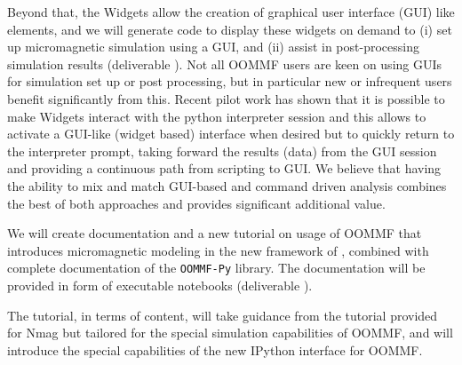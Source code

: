 \begin{workpackage}
\begin{tasklist}
\begin{task}[lead=USO,title=OOMMF case study: Extend \texttt{OOMMF-py} with \Jupyter
    notebook attributes and GUI templates,id=oommf-py-ipython-attributes,PM=6]
  Beyond that, the \Jupyter Widgets allow the creation of graphical
  user interface (GUI) like elements, and we will generate code to
  display these widgets on demand to (i) set up micromagnetic
  simulation using a GUI, and (ii) assist in post-processing
  simulation results (deliverable ).
  Not all OOMMF users are keen on using GUIs for
  simulation set up or post processing, but in particular new or
  infrequent users benefit significantly from this. Recent pilot work
  has shown that it is possible to make \Jupyter Widgets interact with
  the python interpreter session and this allows to activate a
  GUI-like (widget based) interface when desired but to quickly return
  to the interpreter prompt, taking forward the results (data) from
  the GUI session \cite{IPython-widget-GUI-demo-youtube-2014} and
  providing a continuous path from scripting to GUI. We
  believe that having the ability to mix and match GUI-based and
  command driven analysis combines the best of both approaches and
  provides significant additional value.
\end{task}

\begin{task}[lead=USO,title=\OOMMFNB{} demonstrator: executable tutorial and
  documentation, id=oommf-tutorial-and-documentation, PM=7]

  We will create documentation and a new tutorial on usage of OOMMF
  that introduces micromagnetic modeling in the new framework of
  \OOMMFNB{}, combined with complete documentation of the
  \texttt{OOMMF-Py} library. The documentation will be provided in
  form of executable \Jupyter notebooks (deliverable ).

  The tutorial, in terms of content, will take guidance from the
  tutorial provided for Nmag \cite{Nmag-tutorial-url} but tailored for the
  special simulation capabilities of OOMMF, and will introduce the
  special capabilities of the new IPython interface for OOMMF.


\end{task}
\end{tasklist}
\end{workpackage}
